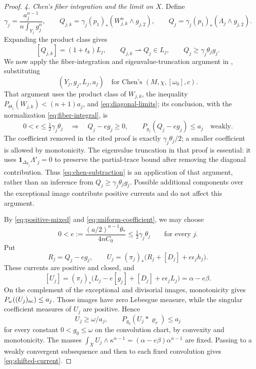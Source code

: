 \documentclass[reqno]{amsart}
\numberwithin{equation}{section}
\theoremstyle{definition}
\begin{document}
\begin{proof}
\smallskip\noindent
\emph{4. Chen's fiber integration and the limit on $X$.}
Define
\begin{equation}\label{eq:fiber-integral}
 \gamma_j=\frac{a_j^{n-1}}{n\int_{Y_j}g_j^n},\qquad
 Q_{j,k}=\gamma_j(p_1)_*(W_{j,k}^n\wedge g_{j,2}),\qquad
 Q_j=\gamma_j(p_1)_*(\Lambda_j\wedge g_{j,2}).
\end{equation}
Expanding the product class gives
\[
 [Q_{j,k}]=(1+t_k)L_j,
 \qquad Q_{j,k}\rightharpoonup Q_j\in L_j,
 \qquad Q_j\ge\gamma_j\theta_j g_j.
\]
We now apply the fiber-integration and eigenvalue-truncation argument
in \cite[proof of Theorem~1.18, Section~3]{C21}, substituting
\[
 (Y_j,g_j,L_j,a_j)
 \quad\text{for Chen's }(M,\chi,[\omega_0],c).
\]
That argument uses the product class of $W_{j,k}$, the inequality
$P_{\Theta_j}(W_{j,k})<(n+1)a_j$, and
\eqref{eq:diagonal-limits}; its conclusion, with the
normalization \eqref{eq:fiber-integral}, is
\begin{equation}\label{eq:chen-subtraction}
 0<e\le\tfrac12\gamma_j\theta_j
 \quad\Longrightarrow\quad
 Q_j-eg_j\ge0,\qquad P_{g_j}(Q_j-eg_j)\le a_j
 \quad\text{weakly}.
\end{equation}
The coefficient removed in the cited proof is exactly
$\gamma_j\theta_j/2$; a smaller coefficient is allowed by
monotonicity. The eigenvalue truncation in that proof is essential:
it uses $\mathbf1_{\Delta_{Y_j}}\Lambda'_j=0$ to preserve the
partial-trace bound after removing the diagonal contribution.
Thus \eqref{eq:chen-subtraction} is an application of
that argument, rather than an inference from $Q_j\ge\gamma_j\theta_jg_j$.
Possible additional components over the exceptional image contribute
positive currents and do not affect this argument.

By \eqref{eq:positive-mixed} and
\eqref{eq:uniform-coefficient}, we may choose
\[
 0<e:=\frac{(a/2)^{n-1}\theta_*}{4nC_0}
       \le\tfrac12\gamma_j\theta_j\qquad\text{for every }j.
\]
Put
\[
 R_j=Q_j-eg_j,\qquad
 U_j=(\pi_j)_*\bigl(R_j+[D_j]+e\epsilon_jh_j\bigr).
\]
These currents are positive and closed, and
\[
 [U_j]
 =(\pi_j)_*\bigl(L_j-e[g_j]+[D_j]+e\epsilon_jL_j\bigr)
 =\alpha-e\beta.
\]
On the complement of the exceptional and divisorial images,
monotonicity gives
$P_\omega((U_j)_{\rm ac})\le a_j$.
Those images have zero Lebesgue measure, while the singular coefficient
measures of $U_j$ are positive. Hence
\[
 U_j\ge\omega/a_j,\qquad
 P_{g_0}(U_j*\varrho_r)\le a_j
\]
for every constant $0<g_0\le\omega$ on the convolution chart,
by convexity and monotonicity. The masses
$\int_XU_j\wedge\kappa^{n-1}=(\alpha-e\beta)\alpha^{n-1}$
are fixed. Passing to a weakly convergent subsequence and then to each
fixed convolution gives \eqref{eq:shifted-current}.
\end{proof}
\end{document}
